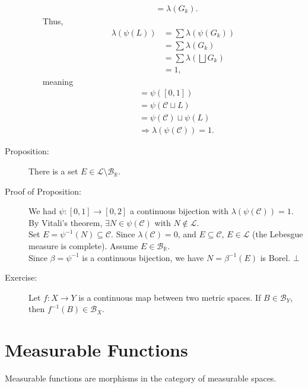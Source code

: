 \documentclass[9pt]{extarticle}
\newcommand{\R}{\mathbb{R}}
\begin{document}
\begin{description}
\begin{enumerate}[(1)]
\begin{align*}
                               &= \lambda(G_k).
          \end{align*}
          Thus,
          \begin{align*}
            \lambda(\psi(L)) &= \sum \lambda(\psi(G_k))\\
                             &= \sum\lambda(G_k)\\
                             &= \sum \lambda\left(\bigsqcup G_k\right)\\
                             &= 1,
          \end{align*}
          meaning
          \begin{align*}
            [0,2] &= \psi([0,1])\\
                  &= \psi(\mathcal{C}\sqcup L)\\
                  &= \psi(\mathcal{C}) \sqcup \psi(L)\\
                  &\Rightarrow \lambda(\psi(\mathcal{C})) = 1.
          \end{align*}
      \end{enumerate}
    \item[Proposition:] There is a set $E\in \mathcal{L}\setminus \mathcal{B}_{\R}$.
    \item[Proof of Proposition:] We had $\psi: [0,1]\rightarrow [0,2]$ a continuous bijection with $\lambda\left(\psi(\mathcal{C})\right) = 1$. By Vitali's theorem, $\exists N\in \psi(\mathcal{C})$ with $N\notin \mathcal{L}$.\\

      Set $E = \psi^{-1}(N)\subseteq \mathcal{C}$. Since $\lambda\left(\mathcal{C}\right) = 0$, and $E\subseteq \mathcal{C}$, $E\in \mathcal{L}$ (the Lebesgue measure is complete). Assume $E\in \mathcal{B}_{\R}$.\\

      Since $\beta = \psi^{-1}$ is a continuous bijection, we have $N = \beta^{-1}(E)$ is Borel. $\bot$
    \item[Exercise:] Let $f: X\rightarrow Y$ is a continuous map between two metric spaces. If $B\in \mathcal{B}_{Y}$, then $f^{-1}(B)\in \mathcal{B}_{X}$.
  \end{description}
  \section{Measurable Functions}%
  Measurable functions are morphisms in the category of measurable spaces.\\
\end{document}
